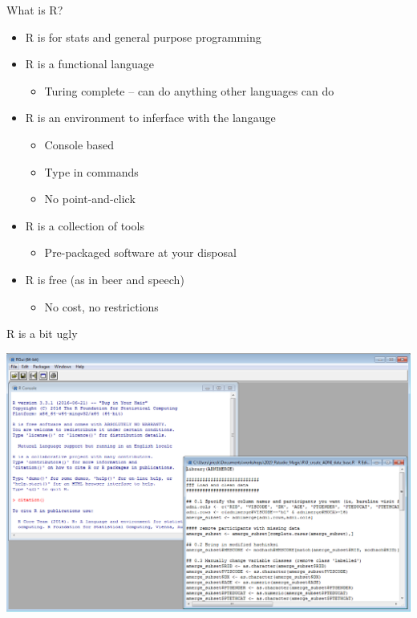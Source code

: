 \documentclass[
  ignorenonframetext,
]{beamer}
\providecommand{\tightlist}{%
  \setlength{\itemsep}{0pt}\setlength{\parskip}{0pt}}
\begin{document}
\begin{frame}{What is R?}
\protect\hypertarget{what-is-r}{}

\begin{itemize}
\tightlist
\item
  R is for stats and general purpose programming
\item
  R is a functional language

  \begin{itemize}
  \tightlist
  \item
    Turing complete -- can do anything other languages can do
  \end{itemize}
\item
  R is an environment to inferface with the langauge

  \begin{itemize}
  \tightlist
  \item
    Console based
  \item
    Type in commands
  \item
    No point-and-click
  \end{itemize}
\item
  R is a collection of tools

  \begin{itemize}
  \tightlist
  \item
    Pre-packaged software at your disposal
  \end{itemize}
\item
  R is free (as in beer and speech)

  \begin{itemize}
  \tightlist
  \item
    No cost, no restrictions
  \end{itemize}
\end{itemize}

\end{frame}

\begin{frame}{R is a bit ugly}
\protect\hypertarget{r-is-a-bit-ugly}{}

\includegraphics{../external/images/intro_rgui.PNG}

\end{frame}
\end{document}
